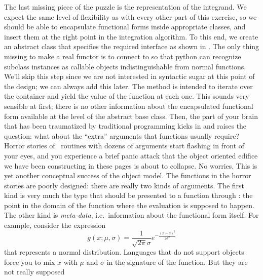 The last missing piece of the puzzle is the representation of the integrand. We expect the same
level of flexibility as with every other part of this exercise, so we should be able to
encapsulate functional forms inside appropriate classes, and insert them at the right point in
the integration algorithm. To this end, we create an abstract class  that
specifies the required interface as shown in . The only thing
missing to make  a real functor\supercite{c++-idioms} is to connect  to
 so that python can recognize subclass instances as callable objects
indistinguishable from normal functions. We'll skip this step since we are not interested in
syntactic sugar at this point of the design; we can always add this later.
%
%
The method  is intended to iterate over the container  and
yield the value of the function at each one. This sounds very sensible at first; there is no
other information about the encapsulated functional form available at the level of the
abstract base class. Then, the part of your brain that has been traumatized by traditional
programming kicks in and raises the question: what about the ``extra'' arguments that functions
usually require? Horror stories of \fortran\ routines with dozens of arguments start flashing
in front of your eyes, and you experience a brief panic attack that the object oriented
edifice we have been constructing in these pages is about to collapse. No worries. This is yet
another conceptual success of the object model. The functions in the horror stories are poorly
designed: there are really two kinds of arguments. The first kind is very much the type that
should be presented to a function through : the point in the domain of the
function where the evaluation is supposed to happen. The other kind is {\em meta-data},
i.e.~information about the functional form itself. For example, consider the expression
\begin{equation}
  g(x; \mu,\sigma) = \frac{1}{\sqrt{2\pi} \sigma} e^{-\frac{(x-\mu)^2}{2\sigma^2}}
\label{eq:gaussian}
\end{equation}
that represents a normal distribution. Languages that do not support objects force you to mix
$x$ with $\mu$ and $\sigma$ in the signature of the function. But they are not really supposed
